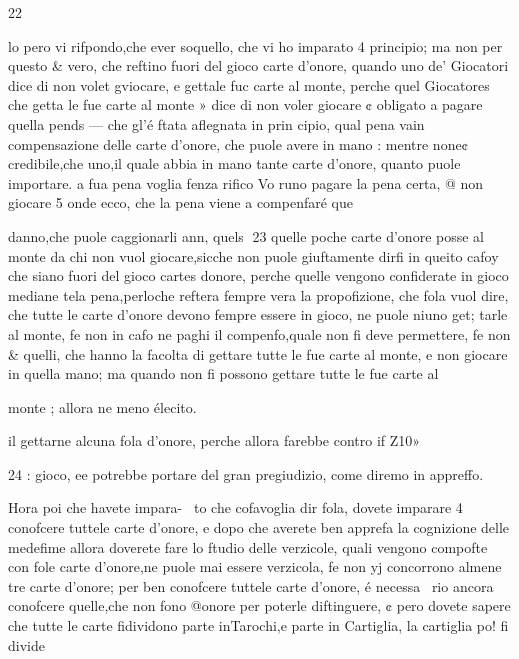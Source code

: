 \documentclass[12pt,a6paper]{article}
\begin{document}
 
 

 

 

 

 

 

 

22

lo pero vi rifpondo,che ever
soquello, che vi ho imparato 4
principio; ma non per questo &
vero, che reftino fuori del gioco carte d’onore, quando uno
de’ Giocatori dice di non volet
gviocare, e gettale fuc carte al
monte, perche quel Giocatores
che getta le fue carte al monte »
dice di non voler giocare ¢
obligato a pagare quella pends —
che gl’é ftata aflegnata in prin
cipio, qual pena vain compensazione delle carte d’onore, che
puole avere in mano : mentre
none¢ credibile,che uno,il quale
abbia in mano tante carte d’onore, quanto puole importare. a
fua pena voglia fenza rifico Vo
runo pagare la pena certa, @
non giocare 5 onde ecco, che la
pena viene a compenfaré que

danno,che puole caggionarli ann,
quels
23
quelle poche carte d’onore posse al monte da chi non vuol
giocare,sicche non puole giuftamente dirfi in queito cafoy che
siano fuori del gioco cartes
donore, perche quelle vengono confiderate in gioco mediane
tela pena,perloche reftera fempre vera la propofizione, che
fola vuol dire, che tutte le carte d’onore devono fempre essere in gioco, ne puole niuno get;
tarle al monte, fe non in cafo
ne paghi il compenfo,quale non
fi deve permettere, fe non &
quelli, che hanno la facolta di
gettare tutte le fue carte al
monte, e non giocare in quella
mano; ma quando non fi possono gettare tutte le fue carte al

monte ; allora ne meno élecito.

il gettarne alcuna fola d’onore,
perche allora farebbe contro if
Z10»

 

 
 

24 :
gioco, ee potrebbe portare del
gran pregiudizio, come diremo
in appreffo.

Hora poi che havete impara-~
to che cofavoglia dir fola, dovete imparare 4 conofcere tuttele carte d’onore, e dopo che
averete ben apprefa la cognizione delle medefime allora doverete fare lo ftudio delle verzicole, quali vengono compofte
con fole carte d’onore,ne puole
mai essere verzicola, fe non yj
concorrono almene tre carte
d’onore; per ben conofcere tuttele carte d’onore, é necessa~
rio ancora conofcere quelle,che
non fono @onore per poterle
diftinguere, ¢ pero dovete sapere che tutte le carte fidividono
parte inTarochi,e parte in Cartiglia, la cartiglia po! fi divide
\end{document}
